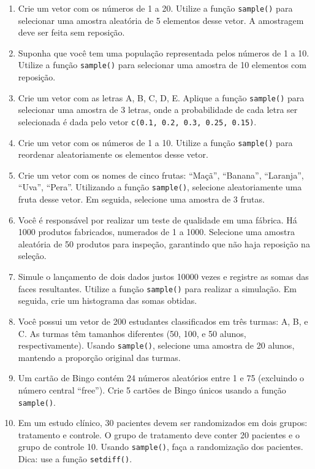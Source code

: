 \documentclass[
]{book}
\begin{document}
\begin{enumerate}
\def\labelenumi{\arabic{enumi}.}
\item
  Crie um vetor com os números de 1 a 20. Utilize a função \texttt{sample()} para selecionar uma amostra aleatória de 5 elementos desse vetor. A amostragem deve ser feita sem reposição.
\item
  Suponha que você tem uma população representada pelos números de 1 a 10. Utilize a função \texttt{sample()} para selecionar uma amostra de 10 elementos com reposição.
\item
  Crie um vetor com as letras A, B, C, D, E. Aplique a função \texttt{sample()} para selecionar uma amostra de 3 letras, onde a probabilidade de cada letra ser selecionada é dada pelo vetor \texttt{c(0.1,\ 0.2,\ 0.3,\ 0.25,\ 0.15)}.
\item
  Crie um vetor com os números de 1 a 10. Utilize a função \texttt{sample()} para reordenar aleatoriamente os elementos desse vetor.
\item
  Crie um vetor com os nomes de cinco frutas: ``Maçã'', ``Banana'', ``Laranja'', ``Uva'', ``Pera''. Utilizando a função \texttt{sample()}, selecione aleatoriamente uma fruta desse vetor. Em seguida, selecione uma amostra de 3 frutas.
\item
  Você é responsável por realizar um teste de qualidade em uma fábrica. Há 1000 produtos fabricados, numerados de 1 a 1000. Selecione uma amostra aleatória de 50 produtos para inspeção, garantindo que não haja reposição na seleção.
\item
  Simule o lançamento de dois dados justos 10000 vezes e registre as somas das faces resultantes. Utilize a função \texttt{sample()} para realizar a simulação. Em seguida, crie um histograma das somas obtidas.
\item
  Você possui um vetor de 200 estudantes classificados em três turmas: A, B, e C. As turmas têm tamanhos diferentes (50, 100, e 50 alunos, respectivamente). Usando \texttt{sample()}, selecione uma amostra de 20 alunos, mantendo a proporção original das turmas.
\item
  Um cartão de Bingo contém 24 números aleatórios entre 1 e 75 (excluindo o número central ``free''). Crie 5 cartões de Bingo únicos usando a função \texttt{sample()}.
\item
  Em um estudo clínico, 30 pacientes devem ser randomizados em dois grupos: tratamento e controle. O grupo de tratamento deve conter 20 pacientes e o grupo de controle 10. Usando \texttt{sample()}, faça a randomização dos pacientes. Dica: use a função \texttt{setdiff()}.
\end{enumerate}
\end{document}
